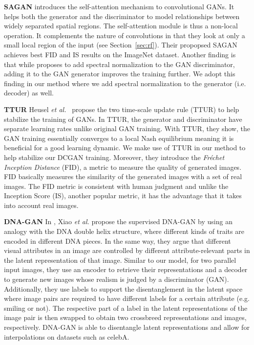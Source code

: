 \documentclass[12pt,a4paper]{article}
\begin{document}
\par \textbf{SAGAN} \cite{SAGAN} introduces the self-attention mechanism to convolutional GANs. It helps both the generator and the discriminator to model relationships between widely separated spatial regions. The self-attention module is thus a non-local operation. It complements the nature of convolutions in that they look at only a small local region of the input (see Section~\ref{sec:rf}). Their propopsed SAGAN achieves best FID and IS results on the ImageNet dataset. Another finding is that while \cite{SNGAN} proposes to add spectral normalization to the GAN discriminator, adding it to the GAN generator improves the training further. We adopt this finding in our method where we add spectral normalization to the generator (i.e. decoder) as well. 

\par \textbf{TTUR} Heusel \textit{et al.}~\cite{TTUR} propose the two time-scale
update rule (TTUR) to help stabilize the training of GANs. In TTUR, the generator and discriminator have separate learning rates unlike original GAN training. With TTUR, they show, the GAN training essentially converges to a local Nash equilibrium meaning it is beneficial for a good learning dynamic. We make use of TTUR in our method to help stabilize our DCGAN training. Moreover, they introduce the \textit{Fréchet Inception Distance} (FID), a metric to measure the quality of generated images. FID basically measures the similarity of the generated images with a set of real images. The FID metric is consistent with human judgment and unlike the Inception Score (IS), another popular metric, it has the advantage that it takes into account real images.

\par \textbf{DNA-GAN} In \cite{DnaGan}, Xiao \textit{et al.} propose the supervised DNA-GAN by using an analogy with the DNA double helix structure, where different kinds of traits are encoded in different DNA pieces. In the same way, they argue that different visual attributes in an image are controlled by different attribute-relevant parts in the latent representation of that image. Similar to our model, for two parallel input images, they use an encoder to retrieve their representations and a decoder to generate new images whose realism is judged by a discriminator (GAN). Additionally, they use labels to support the disentanglement in the latent space where image pairs are required to have different labels for a certain attribute (e.g. smiling or not). The respective part of a label in the latent representations of the image pair is then swapped to obtain two crossbreed representations and images, respectively. DNA-GAN is able to disentangle latent representations and allow for interpolations on datasets such as celebA.
\end{document}
